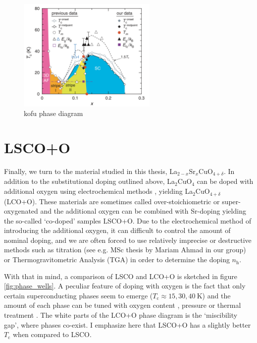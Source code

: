 \begin{figure}
    \centering
    \includegraphics[width=0.6\textwidth]{fig/intro/kofu_phase.png}
    \caption[kofu phase diagram]{kofu phase diagram \cite{Kofu2009}}
    \label{fig:kofu_phase}
\end{figure}

\section{LSCO+O}\label{sec:lscoo}
Finally, we turn to the material studied in this thesis, La$_{2-x}$Sr$_x$CuO$_{4+\delta}$. In addition to the substitutional doping outlined above, La$_2$CuO$_4$ can be doped with additional oxygen using electrochemical methods \cite{Blakeslee1998}, yielding La$_2$CuO$_{4+\delta}$ (LCO+O). These materials are sometimes called over-stoichiometric or super-oxygenated and the additional oxygen can be combined with Sr-doping yielding the so-called `co-doped' samples  LSCO+O. Due to the electrochemical method of introducing the additional oxygen, it can difficult to control the amount of nominal doping, and we are often forced to use relatively imprecise or destructive methods such as titration (see e.g. MSc thesis by Mariam Ahmad in our group) or Thermogravitometric Analysis (TGA) in order to determine the doping $n_\text{h}$.

With that in mind, a comparison of LSCO and LCO+O is sketched in figure \ref{fig:phase_wells}. A peculiar feature of doping with oxygen is the fact that only certain superconducting phases seem to emerge ($T_\text{c} \approx 15, 30, \SI{40}{\kelvin}$) and the amount of each phase can be tuned with oxygen content \cite{Liu2005}, pressure \cite{Lorenz2002} or thermal treatment \cite{Fratini2010}. The white parts of the LCO+O phase diagram is the `miscibility gap', where phases co-exist. I emphasize here that LSCO+O has a slightly better $T_\text{c}$ when compared to LSCO.

